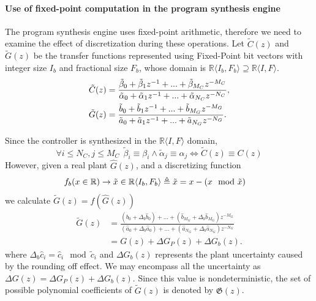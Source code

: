 \documentclass{sig-alternate-05-2015}
\newcommand{\red}[1]{{\color{red}#1}}
\begin{document}

\paragraph{Use of fixed-point computation in the program synthesis engine}
The program synthesis engine uses fixed-point arithmetic,
therefore we need to examine the effect of discretization during these operations.
Let $\tilde C(z)$ and $\tilde G(z)$ be the transfer functions represented
using Fixed-Point bit vectors with integer size $I_b$ and fractional
size $F_b$, whose domain is $\mathbb{R}\langle I_b,F_b \rangle \supseteq \mathbb{R}\langle I,F \rangle$.
%
\begin{align}
\small
\label{digital_controller_plant_tf}
\tilde C(z)&=\frac{\tilde \beta_{0}+\tilde \beta_{1}z^{-1}+...+\tilde \beta_{M_C}z^{-M_C}}{\tilde \alpha_{0}+\tilde \alpha_{1}z^{-1}+...+\tilde \alpha_{N_C}z^{-N_C}}, \\
\tilde G(z)&=\frac{\tilde b_{0}+\tilde b_{1}z^{-1}+...+\tilde b_{M_G}z^{-M_G}}{\tilde a_{0}+\tilde a_{1}z^{-1}+...+\tilde a_{N_G}z^{-N_G}}.
\end{align}
 
Since the controller is synthesized in the $\mathbb{R}\langle I,F \rangle$
domain,
%
 $$\forall i \leq N_C, j \leq M_C\ \  \tilde \beta_{i} \equiv \beta_{i} \wedge \tilde \alpha_{j} \equiv \alpha_{j} \Leftrightarrow \tilde C(z) \equiv C(z)$$
%
However, given a real plant $\hat{G}(z)$, and a discretizing function
\begin{align}
\small
\label{FWL_tf}
&f_b (x \in \mathbb{R}) \rightarrow \tilde x \in \mathbb{R}\langle I_b,F_b \rangle \triangleq \tilde x = x-(x\mod\tilde x)
\end{align}
we calculate $\tilde G(z)=f(\hat{G}(z))$
\begin{align}
\label{digital_plant_tf}
\tilde G(z)&=\frac{(\hat{b}_{0}+\Delta_b \hat{b}_{0}) +...+(\hat{b}_{M_G}+\Delta_b \hat{b}_{M_G})z^{-M_G}}{(\hat{a}_{0}+\Delta_b \hat{a}_{0})+...+(\hat{a}_{N_G}+\Delta_b \hat{a}_{N_G})z^{-N_G}} \nonumber \\
&=G(z)+\Delta{G}_P(z)+\Delta{G}_b(z).
\end{align}
where $\Delta_b\hat{c}_i=\hat{c}_i\mod \tilde{c}_i$
and $\Delta{G}_b(z)$ represents the plant uncertainty caused by
the rounding off effect.  We may encompass all the uncertainty as
$\Delta{G}(z)=\Delta{G}_P(z)+\Delta{G}_b(z)$.  Since this value is
nondeterministic, the set of possible polynomial coefficients of $\tilde G(z)$ is
denoted by $\mathfrak{G}(z)$.
\end{document}
